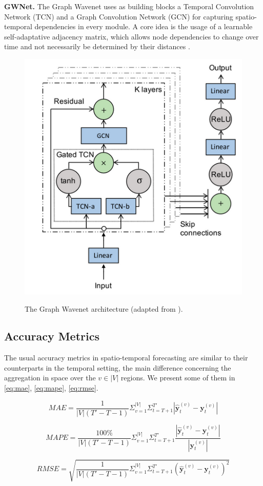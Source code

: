 \noindent
\textbf{GWNet.} The Graph Wavenet uses as building blocks a Temporal Convolution Network (TCN) and a Graph Convolution Network (GCN) for capturing spatio-temporal dependencies in every module. A core idea is the usage of a learnable self-adaptative adjacency matrix, which allows node dependencies to change over time and not necessarily be determined by their distances \cite{wu2019graphwavenet, liu2020intro}.
\begin{figure}[H]
	\centering
    \caption{The Graph Wavenet architecture (adapted from \cite{wu2019graphwavenet}).}
    \includegraphics[scale=0.5]{graphwavenet.png}
	\label{fig:graphwavenet}
\end{figure}

\subsection{Accuracy Metrics}

The usual accuracy metrics in spatio-temporal forecasting are similar to their counterparts in the temporal setting, the main difference concerning the aggregation in space over the $v \in |V|$ regions.
We present some of them in \ref{eq:mae}, \ref{eq:mape}, \ref{eq:rmse}.

\begin{equation}\label{eq:mae_multi}
    MAE = \frac{1}{|V|(T'-T-1)} \Sigma_{v=1}^{|V|} \Sigma_{t=T+1}^{T'} | \bm{\hat{y}}^{(v)}_{t} - \bm{y}_{t}^{(v)} |
\end{equation}


\begin{equation}\label{eq:mape_multi}
    MAPE = \frac{100\%}{|V|(T'-T-1)}\Sigma_{v=1}^{|V|} \Sigma_{t=T+1}^{T'} \frac{ | \bm{\hat{y}}^{(v)}_{t} - \bm{y}_{t}^{(v)} | }{ |\bm{y}_{t}^{(v)}| }
\end{equation}


\begin{equation}\label{eq:rmse_multi}
    RMSE = \sqrt{ \frac{1}{|V|(T'-T-1)} \Sigma_{v=1}^{|V|} \Sigma_{t=T+1}^{T'} (\bm{\hat{y}}^{(v)}_{t} - \bm{y}_{t}^{(v)})^2 }
\end{equation}

